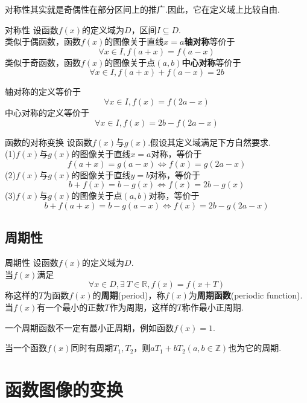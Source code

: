 \documentclass[lang=cn, zihao=5]{elegantbook}
\begin{document}
对称性其实就是奇偶性在部分区间上的推广.因此，它在定义域上比较自由.

\begin{definition}{对称性} %
    设函数$f(x)$的定义域为$D$，区间$I \subseteq D$.\\
    类似于偶函数，函数$f(x)$的图像关于直线$x=a$\textbf{轴对称}等价于
    $$ \forall x \in I, f(a+x)=f(a-x) $$
    类似于奇函数，函数$f(x)$的图像关于点$(a,b)$\textbf{中心对称}等价于
    $$ \forall x \in I, f(a+x)+f(a-x)=2b $$
\end{definition}
\begin{remark}
    轴对称的定义等价于$$\forall x \in I, f(x)=f(2a-x)$$
    中心对称的定义等价于$$\forall x \in I, f(x)=2b-f(2a-x)$$
\end{remark}

\begin{proposition}{函数的对称变换}
    设函数$f(x)$与$g(x)$.假设其定义域满足下方自然要求.\\
    (1)$f(x)$与$g(x)$的图像关于直线$x=a$对称，等价于$$f(a+x)=g(a-x) \Longleftrightarrow f(x)=g(2a-x)$$
    (2)$f(x)$与$g(x)$的图像关于直线$y=b$对称，等价于$$b+f(x)=b-g(x) \Longleftrightarrow f(x)=2b-g(x)$$
    (3)$f(x)$与$g(x)$的图像关于点$(a,b)$对称，等价于$$b+f(a+x)=b-g(a-x) \Longleftrightarrow f(x)=2b-g(2a-x)$$
\end{proposition}

\subsection{周期性}

\begin{definition}{周期性} %
    设函数$f(x)$的定义域为$D$.\\
    当$f(x)$满足$$\forall x \in D, \exists \ T \in \mathbb{R}, f(x)=f(x+T)$$
    称这样的$T$为函数$f(x)$的\textbf{周期}(period)，称$f(x)$为\textbf{周期函数}(periodic function).当$f(x)$有一个最小的正数$T$作为周期，这样的$T$称作最小正周期.
\end{definition}

\begin{remark}
    一个周期函数不一定有最小正周期，例如函数$f(x)=1$.
\end{remark}
\begin{remark}
    当一个函数$f(x)$同时有周期$T_1,T_2$，则$aT_1+bT_2(a,b \in \mathbb{Z})$也为它的周期.
\end{remark}

\section{函数图像的变换}
\end{document}
